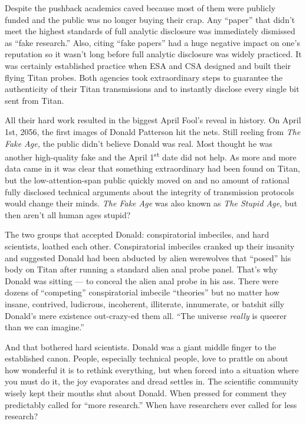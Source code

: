 Despite the pushback academics caved because most of them were publicly
funded and the public was no longer buying their crap. Any ``paper''
that didn't meet the highest standards of full analytic disclosure was
immediately dismissed as ``fake research.'' Also, citing ``fake papers''
had a huge negative impact on one's reputation so it wasn't long before
full analytic disclosure was widely practiced. It was certainly
established practice when ESA and CSA designed and built their flying
Titan probes. Both agencies took extraordinary steps to guarantee the
authenticity of their Titan transmissions and to instantly disclose
every single bit sent from Titan.

All their hard work resulted in the biggest April Fool's reveal in
history. On April 1st, 2056, the first images of Donald Patterson hit
the nets. Still reeling from \emph{The Fake Age,} the public didn't
believe Donald was real. Most thought he was another high-quality fake
and the April 1\textsuperscript{st} date did not help. As more and more
data came in it was clear that something extraordinary had been found on
Titan, but the low-attention-span public quickly moved on and no amount
of rational fully disclosed technical arguments about the integrity of
transmission protocols would change their minds. \emph{The Fake Age} was
also known as \emph{The Stupid Age,} but then aren't all human ages
stupid?

The two groups that accepted Donald: conspiratorial imbeciles, and hard
scientists, loathed each other. Conspiratorial imbeciles cranked up
their insanity and suggested Donald had been abducted by alien
werewolves that ``posed'' his body on Titan after running a standard
alien anal probe panel. That's why Donald was sitting --- to conceal the
alien anal probe in his ass. There were dozens of ``competing''
conspiratorial imbecile ``theories'' but no matter how insane,
contrived, ludicrous, incoherent, illiterate, innumerate, or batshit
silly Donald's mere existence out-crazy-ed them all. ``The universe
\emph{really} is queerer than we can imagine.''

And that bothered hard scientists. Donald was a giant middle finger to
the established canon. People, especially technical people, love to
prattle on about how wonderful it is to rethink everything, but when
forced into a situation where you must do it, the joy evaporates and
dread settles in. The scientific community wisely kept their mouths shut
about Donald. When pressed for comment they predictably called for
``more research.'' When have researchers ever called for less research?

